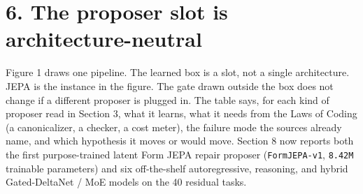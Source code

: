 \documentclass[10pt,letterpaper]{article}
\begin{document}
\section{6. The proposer slot is
architecture-neutral}\label{the-proposer-slot-is-architecture-neutral}

Figure 1 draws one pipeline. The learned box is a slot, not a single
architecture. JEPA is the instance in the figure. The gate drawn outside
the box does not change if a different proposer is plugged in. The table
says, for each kind of proposer read in Section 3, what it learns, what
it needs from the Laws of Coding (a canonicalizer, a checker, a cost
meter), the failure mode the sources already name, and which hypothesis
it moves or would move. Section 8 now reports both the first
purpose-trained latent Form JEPA repair proposer (\texttt{FormJEPA-\allowbreak{}v1},
\texttt{8.42M} trainable parameters) and six off-the-shelf
autoregressive, reasoning, and hybrid Gated-DeltaNet / MoE models on the
40 residual tasks.
\end{document}
